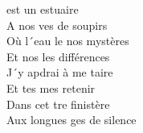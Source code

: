  est un estuaire \\
A nos ves de soupirs \\
Où l´eau le nos mystères \\
Et nos les différences \\
J´y apdrai à me taire \\
Et tes mes retenir \\
Dans cet tre finistère \\
Aux longues ges de silence 